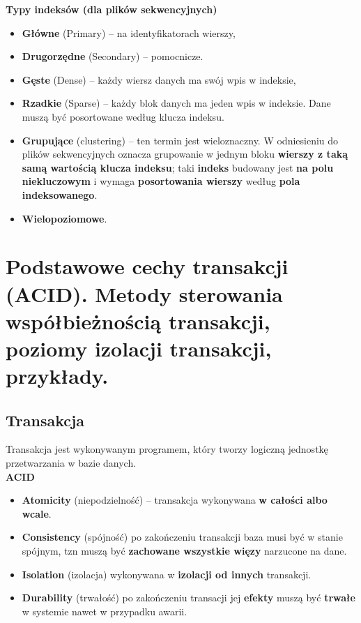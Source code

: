 \documentclass[main.tex]{subfiles}
\begin{document}
    \noindent \textbf{Typy indeksów (dla plików sekwencyjnych)}
    \begin{itemize}[noitemsep]
        \item \textbf{Główne} (Primary) -- na identyfikatorach wierszy,
        \item \textbf{Drugorzędne} (Secondary) -- pomocnicze.\\

        \item \textbf{Gęste} (Dense) -- każdy wiersz danych ma swój wpis w indeksie,
        \item \textbf{Rzadkie} (Sparse) -- każdy blok danych ma jeden wpis w indeksie. Dane muszą być posortowane według
        klucza indeksu.\\

        \item \textbf{Grupujące} (clustering) – ten termin jest wieloznaczny. W odniesieniu do plików sekwencyjnych
        oznacza grupowanie w jednym bloku \textbf{wierszy z taką samą wartością klucza indeksu}; taki \textbf{indeks}
        budowany jest \textbf{na polu niekluczowym} i wymaga \textbf{posortowania wierszy} według \textbf{pola indeksowanego}.
        \item \textbf{Wielopoziomowe}.
    \end{itemize}


    \section{Podstawowe cechy transakcji (ACID). Metody sterowania współbieżnością transakcji, poziomy izolacji transakcji, przykłady.}

    \subsection{Transakcja}
    Transakcja jest wykonywanym programem, który tworzy logiczną jednostkę przetwarzania w
    bazie danych.\\

    \noindent \textbf{ACID}
    \begin{itemize}[noitemsep]
        \item \textbf{Atomicity} (niepodzielność) -- transakcja wykonywana \textbf{w całości albo wcale}.
        \item \textbf{Consistency} (spójność) po zakończeniu transakcji baza musi być w stanie spójnym, tzn muszą być \textbf{zachowane wszystkie więzy} narzucone na dane.
        \item \textbf{Isolation} (izolacja) wykonywana w \textbf{izolacji od innych} transakcji.
        \item \textbf{Durability} (trwałość) po zakończeniu transacji jej \textbf{efekty} muszą być \textbf{trwałe} w systemie nawet w przypadku awarii.
    \end{itemize}
\end{document}
